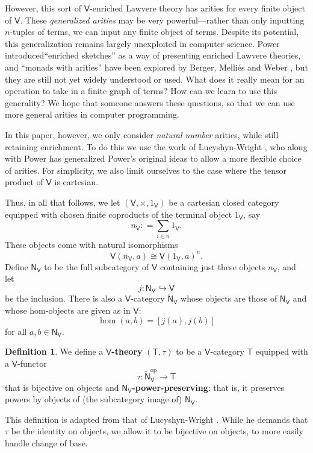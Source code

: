 \documentclass{amsart}
\theoremstyle{definition}
\newtheorem{definition}[theorem]{Definition}
\newcommand{\NN}{\mathsf{N}}
\newcommand{\V}{\mathsf{V}}
\newcommand{\T}{\mathsf{T}}
\newcommand{\op}{\mathrm{op}}
\newcommand{\maps}{\colon}
\begin{document}
However, this sort of $\V$-enriched Lawvere theory has arities for every finite object of $\V$.  These \textit{generalized arities} may be very powerful---rather than only inputting $n$-tuples of terms, we can input any finite object of terms.  Despite its potential, this generalization remains largely unexploited in computer science.   Power \cite{powsketch} introduced``enriched sketches'' as a way of presenting enriched Lawvere theories, and ``monads with arities'' have been explored by Berger, Melli\'es and Weber \cite{bergermelliesweber}, but they are still not yet widely understood or used.  What does it really mean for an operation to take in a finite graph of terms?  How can we learn to use this generality?  We hope that someone answers these questions, so that we can use more general arities in computer programming.


In this paper, however, we only consider \textit{natural number} arities, while still retaining enrichment. To do this we use the work of Lucyshyn-Wright \cite{lucyshyn-wright}, who along with Power \cite{np} has generalized Power's original ideas to allow a more flexible choice of arities.    For simplicity, we also limit ourselves to the case where the tensor product of $\V$ is cartesian.  

Thus, in all that follows, we let $(\V,\times,1_\V)$ be a cartesian closed category equipped with chosen finite coproducts of the terminal object $1_\V$, say 
\[   n_\V : = \sum_{i \in n} 1_\V . \]  
These objects come with natural isomorphisms
\begin{equation}
\V(n_\V,a) \cong\V(1_\V,a)^n .
\end{equation}
Define $\NN_\V$ to be the full subcategory of $\V$ containing just these objects $n_\V$, and let
\[ j \maps \NN_\V \hookrightarrow \V \]
be the inclusion.  There is also a $\V$-category $\tilde{\NN}_\V$ whose objects are those of $\NN_\V$ and whose hom-objects are given as in $\V$:
\[         \hom(a,b) = [j(a), j(b)]   \]
for all $a,b \in \NN_\V$.

\begin{definition}
\label{defn:V-theory}
We define a \textbf{$\V$-theory} $(\T,\tau)$ to be a $\V$-category $\T$ 
equipped with a $\V$-functor 
\[ \tau  \maps\tilde{\NN}_\V^\op \to \T \]
that is bijective on objects and \textbf{$\NN_\V$-power-preserving}: that is, it preserves powers by objects of (the subcategory image of) $\NN_\V$. 
\end{definition}
\noindent
This definition is adapted from that of Lucyshyn-Wright \cite{lucyshyn-wright}.  While he demands that $\tau$ be the identity on objects, we allow it to be bijective on objects, to more easily handle change of base.
\end{document}
